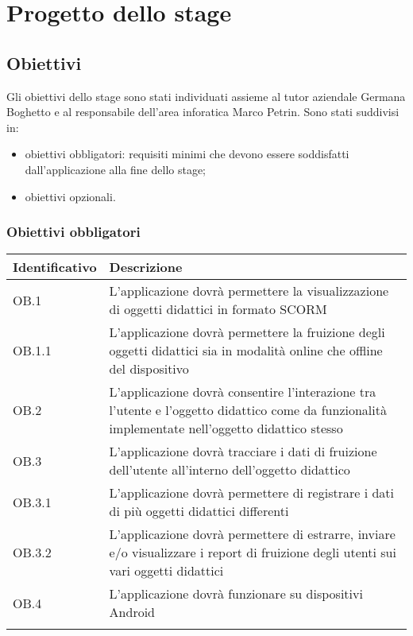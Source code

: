 \documentclass[../Tesi.tex]{subfiles}
\begin{document}
\section{Progetto dello stage}

	\subsection{Obiettivi}
		Gli obiettivi dello stage sono stati individuati assieme al tutor aziendale Germana Boghetto e al responsabile dell'area inforatica Marco Petrin. Sono stati suddivisi in:
		\begin{itemize}
			\item obiettivi obbligatori: requisiti minimi che devono essere soddisfatti dall'applicazione alla fine dello stage;
			\item obiettivi opzionali.
		\end{itemize}

		\subsubsection{Obiettivi obbligatori}
			\begin{longtabu} to \textwidth {X[0.3cm] X}
				\toprule
				\textbf{Identificativo} & \textbf{Descrizione} \\
				\midrule
				\endhead
				OB.1 & L’applicazione dovrà permettere la visualizzazione di oggetti didattici in formato SCORM \\
				\midrule
				OB.1.1 & L’applicazione dovrà permettere la fruizione degli oggetti didattici sia in modalità online che offline del dispositivo \\
				\midrule
				OB.2 & L’applicazione dovrà consentire l’interazione tra l’utente e l’oggetto didattico come da funzionalità implementate nell’oggetto didattico stesso \\
				\midrule
				OB.3 & L’applicazione dovrà tracciare i dati di fruizione dell’utente all’interno dell’oggetto didattico \\
				\midrule
				OB.3.1 & L’applicazione dovrà permettere di registrare i dati di più oggetti didattici differenti \\
				\midrule
				OB.3.2 & L’applicazione dovrà permettere di estrarre, inviare e/o visualizzare i report di fruizione degli utenti sui vari oggetti didattici \\
				\midrule
				OB.4 & L’applicazione dovrà funzionare su dispositivi Android \\
				\bottomrule
			\end{longtabu}
\end{document}
